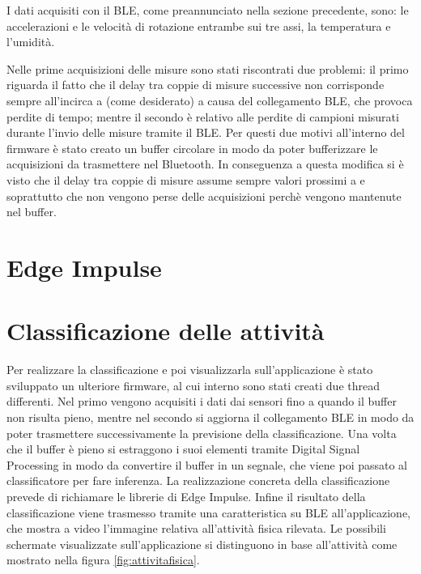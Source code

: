 I dati acquisiti con il BLE, come preannunciato nella sezione precedente, sono: le accelerazioni e le velocità di rotazione entrambe sui tre assi, la temperatura e l'umidità.

Nelle prime acquisizioni delle misure sono stati riscontrati due problemi: il primo riguarda il fatto che il delay tra coppie di misure successive non corrisponde sempre all'incirca a %
(come desiderato) a causa del collegamento BLE, che provoca perdite di tempo; mentre il secondo è relativo alle perdite di campioni  misurati durante l'invio delle misure tramite il BLE. Per questi due motivi all'interno del firmware è stato creato un buffer circolare in modo da poter bufferizzare le acquisizioni da trasmettere nel Bluetooth. In conseguenza a questa modifica si è visto che il delay tra coppie di misure assume sempre valori prossimi a %
e soprattutto che non vengono perse delle acquisizioni perchè vengono mantenute nel buffer.



\section{Edge Impulse}

\section{Classificazione delle attività}
Per realizzare la classificazione e poi visualizzarla sull'applicazione è stato sviluppato un ulteriore firmware, al cui interno sono stati creati due thread differenti. Nel primo vengono acquisiti i dati dai sensori fino a quando il buffer non risulta pieno, mentre nel secondo si aggiorna il collegamento BLE in modo da poter trasmettere successivamente la previsione della classificazione. Una volta che il buffer è pieno si estraggono i suoi elementi tramite Digital Signal Processing in modo da convertire il buffer in un segnale, che viene poi passato al classificatore per fare inferenza. La realizzazione concreta della classificazione prevede di richiamare le librerie di Edge Impulse. Infine il risultato della classificazione viene trasmesso tramite una caratteristica su BLE all'applicazione, che mostra a video l'immagine relativa all'attività fisica rilevata. Le possibili schermate visualizzate sull'applicazione si distinguono in base all'attività come mostrato nella figura \ref{fig:attivitafisica}.

